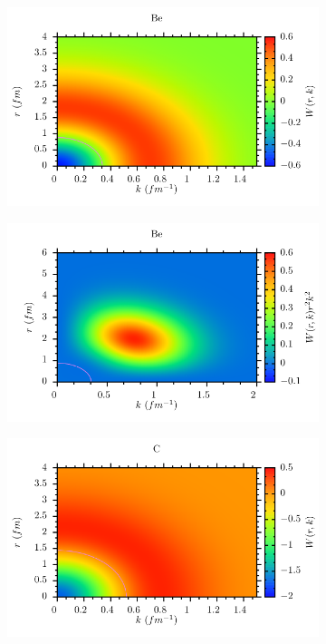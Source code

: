 \documentclass[11pt,twoside]{book}
\begin{document}
\begin{figure} 
\centering
 \begin{subfigure}[b]{0.49\textwidth} 
 	\includegraphics[width=\textwidth]{./figuren/Be.pdf}  
 \end{subfigure} 
 \begin{subfigure}[b]{0.49\textwidth} 
 	\includegraphics[width=\textwidth]{./figuren/Beprob.pdf}  
 \end{subfigure}  
 \begin{subfigure}[b]{0.49\textwidth} 
 	\includegraphics[width=\textwidth]{./figuren/C.pdf}  

\end{subfigure}
\end{figure}
\end{document}
